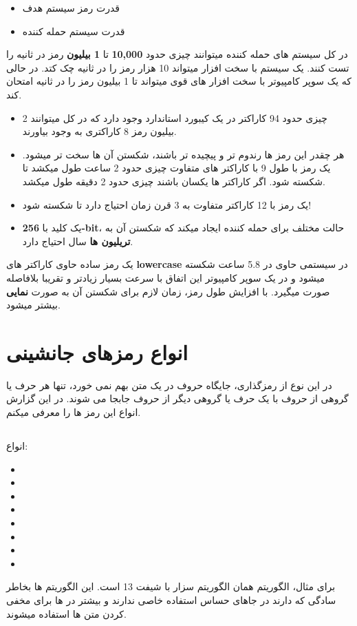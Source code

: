 \begin{itemize}
    \item    
    قدرت رمز سیستم هدف
    \item
    قدرت سیستم حمله کننده
\end{itemize}
در کل سیستم های حمله کننده میتوانند چیزی حدود 
\textbf{10,000}
تا 
\textbf{1 بیلیون}
رمز در ثانیه را تست کنند.
یک سیستم با سخت افزار 
میتواند 10 هزار رمز را در ثانیه چک کتد.
در حالی که یک سوپر کامپیوتر با سخت افزار های قوی میتواند تا 1 بیلیون رمز را در ثانیه امتحان کند.
\begin{itemize}
    \item    
    چیزی حدود 94 کاراکتر در یک کیبورد استاندارد وجود دارد که در کل میتوانند 2 بیلیون رمز 8 کاراکتری به وجود بیاورند.
    \item
    هر چقدر این رمز ها رندوم تر و پیچیده تر باشند، شکستن آن ها سخت تر میشود. یک رمز با طول 9 با کاراکتر های متفاوت چیزی حدود 2 ساعت طول میکشد تا شکسته شود. اگر کاراکتر ها یکسان باشند چیزی حدود 2 دقیقه طول میکشد.
    \item
    یک رمز با 12 کاراکتر متفاوت به 3 قرن زمان احتیاج دارد تا شکسته شود!
    \item
    یک کلید با 
    \textbf{256-bit}،
    حالت مختلف برای حمله کننده ایجاد میکند که شکستن آن به 
    \textbf{تریلیون ها}
    سال احتیاج دارد.
\end{itemize}
یک رمز ساده حاوی کاراکتر های 
\textbf{lowercase}
در سیستمی حاوی 
در 5.8 ساعت شکسته میشود 
و در یک سوپر کامپیوتر این اتفاق با سرعت بسیار زیادتر و تقریبا بلافاصله صورت میگیرد.
با افزایش طول رمز، زمان لازم برای شکستن آن به صورت 
\textbf{نمایی}
بیشتر میشود.

\section{انواع رمزهای جانشینی}
در این نوع از رمزگذاری، جایگاه حروف در یک متن بهم نمی خورد، تنها هر حرف یا گروهی از حروف با یک
حرف یا گروهی دیگر از حروف جابجا می شوند.
در این گزارش انواع این رمز ها را معرفی میکنم.
\subsection{}
انواع:
\begin{itemize}
    \item   
    \item
    \item
    \item
    \item
    \item
    \item
    \item
\end{itemize}
برای مثال، الگوریتم 
همان الگوریتم سزار با شیفت 13 است.
این الگوریتم ها بخاطر سادگی که دارند در جاهای حساس استفاده خاصی ندارند و بیشتر در 
 ها
برای مخفی کردن متن ها استفاده میشوند.
